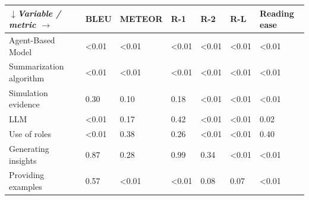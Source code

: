 \begin{tabular}{|l|l|l|l|l|l|l|}
\hline
\textit{$\downarrow$Variable / metric $\rightarrow$} & BLEU & METEOR & R-1 & R-2 & R-L & Reading ease \\
 \hline
 Agent-Based Model & \textless{}0.01 & \textless{}0.01 & \textless{}0.01 & \textless{}0.01 & \textless{}0.01 & \textless{}0.01 \\
 \hline
 Summarization algorithm & \textless{}0.01 & \textless{}0.01 & \textless{}0.01 & \textless{}0.01 & \textless{}0.01 & \textless{}0.01 \\
 \hline
 Simulation evidence & 0.30 & 0.10 & 0.18 & \textless{}0.01 & \textless{}0.01 & \textless{}0.01 \\
 \hline
 LLM & \textless{}0.01 & 0.17 & 0.42 & \textless{}0.01 & \textless{}0.01 & 0.02 \\
 \hline
 Use of roles & \textless{}0.01 & 0.38 & 0.26 & \textless{}0.01 & \textless{}0.01 & 0.40 \\
 \hline
 Generating insights & 0.87 & 0.28 & 0.99 & 0.34 & \textless{}0.01 & \textless{}0.01 \\
 \hline
 Providing examples & 0.57 & \textless{}0.01 & \textless{}0.01 & 0.08 & 0.07 & \textless{}0.01 \\
\hline
\end{tabular}
